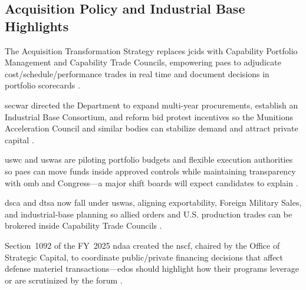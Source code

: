 \documentclass[../main.tex]{subfiles}
\begin{document}
\subsection{Acquisition Policy and Industrial Base Highlights}
\begin{description}[style=nextline,labelsep=0.5em,font=\bfseries]
  \item[\textbf{\ac{was}.}] The Acquisition Transformation Strategy replaces \ac{jcids} with Capability Portfolio Management and Capability Trade Councils, empowering \acp{pae} to adjudicate cost/schedule/performance trades in real time and document decisions in portfolio scorecards \autocite{secwar-acq-transformation-2025}.
  \item[\textbf{Industrial base actions.}] \ac{secwar} directed the Department to expand multi-year procurements, establish an Industrial Base Consortium, and reform bid protest incentives so the Munitions Acceleration Council and similar bodies can stabilize demand and attract private capital \autocite{secwar-acq-transformation-2025}.
  \item[\textbf{\ac{ppbe} integration.}] \ac{uswc} and \ac{uswas} are piloting portfolio budgets and flexible execution authorities so \acp{pae} can move funds inside approved controls while maintaining transparency with \ac{omb} and Congress---a major shift boards will expect candidates to explain \autocite{secwar-acq-transformation-2025}.
  \item[\textbf{Security cooperation realignment.}] \ac{dsca} and \ac{dtsa} now fall under \ac{uswas}, aligning exportability, Foreign Military Sales, and industrial-base planning so allied orders and U.S. production trades can be brokered inside Capability Trade Councils \autocite{secwar-arms-transfer-2025}.
  \item[\textbf{National Security Capital Forum.}] Section~1092 of the FY~2025 \ac{ndaa} created the \ac{nscf}, chaired by the Office of Strategic Capital, to coordinate public/private financing decisions that affect defense materiel transactions---\acp{edo} should highlight how their programs leverage or are scrutinized by the forum \autocite{secwar-nscf-2025}.
\end{description}

\IfSubfilesClassLoaded{}{}
\end{document}
